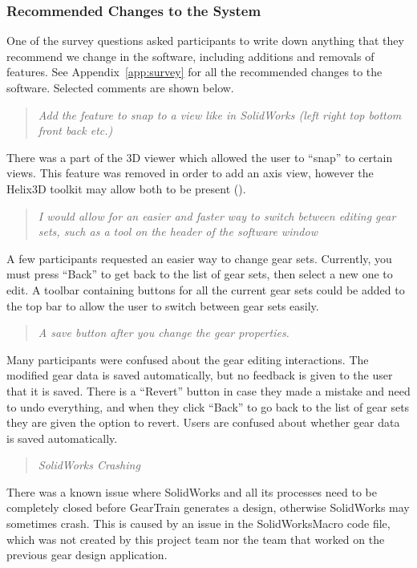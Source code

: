\begin{doublespace}
\subsubsection{Recommended Changes to the System}
One of the survey questions asked participants to write down anything that they recommend we change in the software, including additions and removals of features. See Appendix~\ref{app:survey} for all the recommended changes to the software. Selected comments are shown below.
\begin{quote}
    \emph{Add the feature to snap to a view like in SolidWorks (left right top bottom front back etc.)}
\end{quote}
\noindent There was a part of the 3D viewer which allowed the user to ``snap'' to certain views. This feature was removed in order to add an axis view, however the Helix3D toolkit may allow both to be present (\cite{bjorke_helix_2020}).
\begin{quote}
    \emph{I would allow for an easier and faster way to switch between editing gear sets, such as a tool on the header of the software window}
\end{quote}
\noindent A few participants requested an easier way to change gear sets. Currently, you must press ``Back'' to get back to the list of gear sets, then select a new one to edit. A toolbar containing buttons for all the current gear sets could be added to the top bar to allow the user to switch between gear sets easily.
\begin{quote}
    \emph{A save button after you change the gear properties.}
\end{quote}
\noindent Many participants were confused about the gear editing interactions. The modified gear data is saved automatically, but no feedback is given to the user that it is saved. There is a ``Revert'' button in case they made a mistake and need to undo everything, and when they click ``Back'' to go back to the list of gear sets they are given the option to revert. Users are confused about whether gear data is saved automatically.
\begin{quote}
    \emph{SolidWorks Crashing}
\end{quote}
\noindent There was a known issue where SolidWorks and all its processes need to be completely closed before GearTrain generates a design, otherwise SolidWorks may sometimes crash. This is caused by an issue in the SolidWorksMacro code file, which was not created by this project team nor the team that worked on the previous gear design application.
\begin{quote}

\end{quote}
\end{doublespace}
